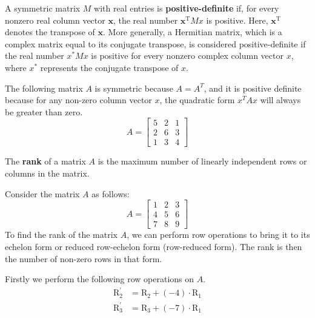 \begin{definition}

\begin{definition}
    A symmetric matrix $M$ with real entries is \textbf{positive-definite} if, for every nonzero real column vector $\mathbf{x}$, the real number $\mathbf{x}^{\mathrm{T}} Mx$ is positive. Here, $\mathbf{x}^{\mathrm{T}}$ denotes the transpose of $\mathbf{x}$. More generally, a Hermitian matrix, which is a complex matrix equal to its conjugate transpose, is considered positive-definite if the real number $x^{*}Mx$ is positive for every nonzero complex column vector $x$, where $x^{*}$ represents the conjugate transpose of $x$.
\end{definition}
\begin{example}
The following matrix $A$ is symmetric because \( A = A^T \), and it is positive definite because for any non-zero column vector \( x \), the quadratic form \( x^T A x \) will always be greater than zero.
    \[ A = \begin{bmatrix} 5 & 2 & 1 \\ 2 & 6 & 3 \\ 1 & 3 & 4 \end{bmatrix} \]
\end{example}

\begin{definition}
The \textbf{rank} of a matrix $A$ is the maximum number of linearly independent rows or columns in the matrix. 
\end{definition}


\begin{example}
Consider the matrix $A$ as follows:
    \[ A = \begin{bmatrix} 1 & 2 & 3 \\ 4 & 5 & 6 \\ 7 & 8 & 9 \end{bmatrix} \]
    To find the rank of the matrix \( A \), we can perform row operations to bring it to its echelon form or reduced row-echelon form (row-reduced form). The rank is then the number of non-zero rows in that form.

Firstly we perform the following row operations on \( A \).
\begin{align*}
\text{R}_{2}^{'} &= \text{R}_2 + (-4) \cdot \text{R}_1 \\
\text{R}_{3}^{'} &= \text{R}_3 + (-7) \cdot \text{R}_1
\end{align*}


\end{example}
\end{definition}
